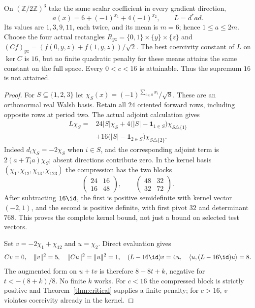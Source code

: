 \begin{example}\label{ex:rectangle}
On $(\mathbb Z/2\mathbb Z)^3$ take the same scalar coefficient in every
gradient direction,
\[
 a(x)=6+(-1)^{x_1}+4(-1)^{x_2},\qquad L=d^*ad.
\]
Its values are $1,3,9,11$, each twice, and its mean is $m=6$; hence
$1\leq a\leq2m$. Choose the four actual rectangles
$R_{yz}=\{0,1\}\times\{y\}\times\{z\}$ and
$(Cf)_{yz}=(f(0,y,z)+f(1,y,z))/\sqrt2$.
The best coercivity constant of $L$ on $\ker C$ is $16$, but no finite
quadratic penalty for these means attains the same constant on the full
space. Every $0<c<16$ is attainable. Thus the supremum $16$ is not attained.
\end{example}
\begin{proof}
For $S\subseteq\{1,2,3\}$ let
$\chi_S(x)=(-1)^{\sum_{i\in S}x_i}/\sqrt8$. These are an orthonormal real
Walsh basis. Retain all $24$ oriented forward rows, including opposite rows
at period two. The actual adjoint calculation gives
\begin{align*}
 L\chi_S={}&24|S|\chi_S
 +4\bigl(|S|-\boldsymbol1_{1\in S}\bigr)\chi_{S\triangle\{1\}}\\
 &+16\bigl(|S|-\boldsymbol1_{2\in S}\bigr)\chi_{S\triangle\{2\}}.
\end{align*}
Indeed $d_i\chi_S=-2\chi_S$ when $i\in S$, and the corresponding
adjoint term is $2(a+T_i a)\chi_S$; absent directions contribute zero.
In the kernel basis $(\chi_1,\chi_{12},\chi_{13},\chi_{123})$ the compression
has the two blocks
\[
 \begin{pmatrix}24&16\\16&48\end{pmatrix},\qquad
 \begin{pmatrix}48&32\\32&72\end{pmatrix}.
\]
After subtracting $16\id$, the first is positive semidefinite with kernel
vector $(-2,1)$, and the second is positive definite, with first pivot $32$
and determinant $768$. This proves the complete kernel bound, not just a
bound on selected test vectors.

Set $v=-2\chi_1+\chi_{12}$ and $u=\chi_2$. Direct evaluation gives
\[
 Cv=0,\quad\|v\|^2=5,\quad\|Cu\|^2=\|u\|^2=1,
 \quad(L-16\id)v=4u,\quad\langle u,(L-16\id)u\rangle=8.
\]
The augmented form on $u+tv$ is therefore $8+8t+k$, negative for
$t<-(8+k)/8$. No finite $k$ works. For $c<16$ the compressed block is
strictly positive and Theorem~\ref{thm:critical} supplies a finite penalty;
for $c>16$, $v$ violates coercivity already in the kernel.
\end{proof}

